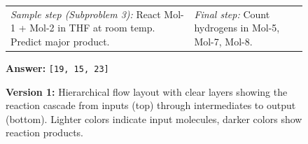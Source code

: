 \documentclass{article}
\begin{document}
\begin{figure}[t]
\begin{tcolorbox}
    \vspace{0.1cm}
    \begin{tabular}{@{}p{}p{}@{}}
    \textit{Sample step (Subproblem 3):} React Mol-1 + Mol-2 in THF at room temp. Predict major product. &
    \textit{Final step:} Count hydrogens in Mol-5, Mol-7, Mol-8. \\
    \end{tabular}

    \vspace{0.25cm}
    \hfill \textbf{Answer:} \texttt{[19, 15, 23]}
    \end{tcolorbox}

    \caption{\textbf{Version 1:} Hierarchical flow layout with clear layers showing the reaction cascade from inputs (top) through intermediates to output (bottom). Lighter colors indicate input molecules, darker colors show reaction products.}
\end{figure}
\end{document}
